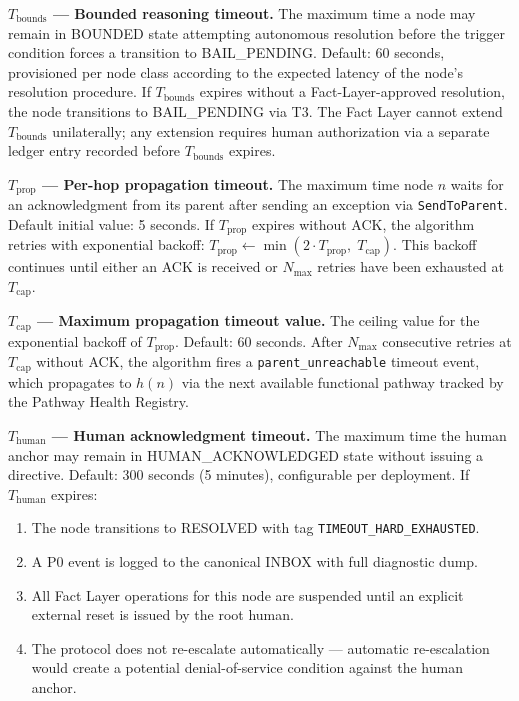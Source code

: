 \bigskip
\noindent\textbf{$T_{\text{bounds}}$ — Bounded reasoning timeout.} The maximum time a node may remain in BOUNDED state attempting autonomous resolution before the trigger condition forces a transition to BAIL\_PENDING. Default: 60 seconds, provisioned per node class according to the expected latency of the node's resolution procedure. If $T_{\text{bounds}}$ expires without a Fact-Layer-approved resolution, the node transitions to BAIL\_PENDING via T3. The Fact Layer cannot extend $T_{\text{bounds}}$ unilaterally; any extension requires human authorization via a separate ledger entry recorded before $T_{\text{bounds}}$ expires.

\bigskip
\noindent\textbf{$T_{\text{prop}}$ — Per-hop propagation timeout.} The maximum time node $n$ waits for an acknowledgment from its parent after sending an exception via \texttt{SendToParent}. Default initial value: 5 seconds. If $T_{\text{prop}}$ expires without ACK, the algorithm retries with exponential backoff: $T_{\text{prop}} \leftarrow \min(2 \cdot T_{\text{prop}},\; T_{\text{cap}})$. This backoff continues until either an ACK is received or $N_{\max}$ retries have been exhausted at $T_{\text{cap}}$.

\bigskip
\noindent\textbf{$T_{\text{cap}}$ — Maximum propagation timeout value.} The ceiling value for the exponential backoff of $T_{\text{prop}}$. Default: 60 seconds. After $N_{\max}$ consecutive retries at $T_{\text{cap}}$ without ACK, the algorithm fires a \texttt{parent\_unreachable} timeout event, which propagates to $h(n)$ via the next available functional pathway tracked by the Pathway Health Registry.

\bigskip
\noindent\textbf{$T_{\text{human}}$ — Human acknowledgment timeout.} The maximum time the human anchor may remain in HUMAN\_ACKNOWLEDGED state without issuing a directive. Default: 300 seconds (5 minutes), configurable per deployment. If $T_{\text{human}}$ expires:

\begin{enumerate}
\item The node transitions to RESOLVED with tag \texttt{TIMEOUT\_HARD\_EXHAUSTED}.
\item A P0 event is logged to the canonical INBOX with full diagnostic dump.
\item All Fact Layer operations for this node are suspended until an explicit external reset is issued by the root human.
\item The protocol does not re-escalate automatically — automatic re-escalation would create a potential denial-of-service condition against the human anchor.
\end{enumerate}

